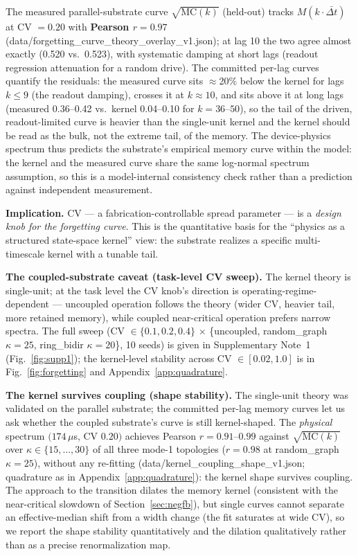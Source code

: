 \documentclass[11pt]{article}
\newcommand{\Dt}{\Delta t}
\newcommand{\MCI}{\mathrm{MC}}
\begin{document}
The measured parallel-substrate curve $\sqrt{\MCI(k)}$ (held-out) tracks
$M(k\cdot\bar{\Dt})$ at CV $=0.20$ with \textbf{Pearson $r=0.97$}
(data/forgetting\_curve\_theory\_overlay\_v1.json); at lag 10
the two agree almost exactly (0.520 vs.\ 0.523), with systematic damping at
short lags (readout regression attenuation for a random drive). The
committed per-lag curves quantify the residuals: the measured curve sits
$\approx$20\% below the kernel for lags $k\le9$ (the readout damping), crosses
it at $k\approx10$, and sits above it at long lags (measured 0.36--0.42
vs.\ kernel 0.04--0.10 for $k=36$--$50$), so the tail of the driven,
readout-limited curve is heavier than the single-unit kernel and the kernel
should be read as the bulk, not the extreme tail, of the memory.
The
device-physics spectrum thus predicts the substrate's empirical memory curve
within the model: the kernel and the measured curve share the same
log-normal spectrum assumption, so this is a model-internal consistency
check rather than a prediction against independent measurement.

\textbf{Implication.} CV --- a fabrication-controllable spread parameter --- is
a \emph{design knob for the forgetting curve}. This is the quantitative basis
for the ``physics as a structured state-space kernel'' view: the substrate
realizes a specific multi-timescale kernel with a tunable tail.

\textbf{The coupled-substrate caveat (task-level CV sweep).} The kernel theory
is single-unit; at the task level the CV knob's direction is
operating-regime-dependent --- uncoupled operation follows the theory (wider
CV, heavier tail, more retained memory), while coupled near-critical operation
prefers narrow spectra. The full sweep (CV $\in\{0.1,0.2,0.4\}$ $\times$
\{uncoupled, random\_graph $\kappa=25$, ring\_bidir $\kappa=20$\}, 10 seeds) is
given in Supplementary Note~1 (Fig.~\ref{fig:supp1}); the kernel-level stability across
CV $\in[0.02,1.0]$ is in Fig.~\ref{fig:forgetting} and
Appendix~\ref{app:quadrature}.

\textbf{The kernel survives coupling (shape stability).} The single-unit
theory was validated on the parallel substrate; the committed per-lag
memory curves let us ask whether the coupled substrate's curve is still
kernel-shaped. The \emph{physical} spectrum $(174\,\mu$s, CV $0.20)$
achieves Pearson $r = 0.91$--$0.99$ against $\sqrt{\mathrm{MC}(k)}$ over
$\kappa \in \{15,\dots,30\}$ of all three mode-1 topologies ($r=0.98$ at
random\_graph $\kappa{=}25$), without any re-fitting
(data/kernel\_coupling\_shape\_v1.json; quadrature as in
Appendix~\ref{app:quadrature}): the kernel shape survives coupling. The
approach to the transition dilates the memory kernel (consistent with
the near-critical slowdown of Section~\ref{sec:negfb}), but single
curves cannot separate an effective-median shift from a width change
(the fit saturates at wide CV), so we report the shape stability
quantitatively and the dilation qualitatively rather than as a precise
renormalization map.
\end{document}
